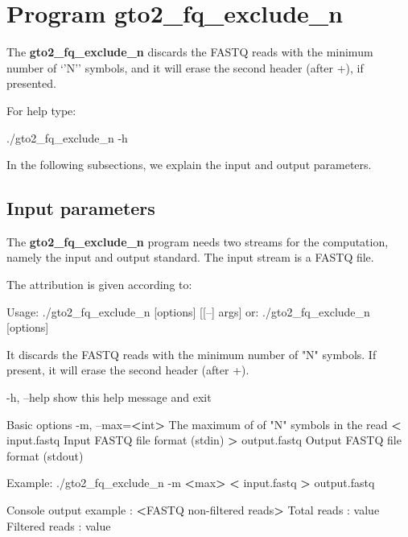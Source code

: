 \documentclass[11pt,]{krantz}
\newenvironment{Shaded}{\begin{snugshade}}{\end{snugshade}}
\newcommand{\StringTok}[1]{\textcolor[rgb]{0.5,0.5,0.5}{#1}}
\newcommand{\OperatorTok}[1]{\textcolor[rgb]{0.43,0.43,0.43}{\textbf{#1}}}
\newcommand{\ExtensionTok}[1]{#1}
\newcommand{\NormalTok}[1]{#1}
\begin{document}
\section{Program gto2\_fq\_exclude\_n}\label{program-gto2_fq_exclude_n}

The \textbf{gto2\_fq\_exclude\_n} discards the FASTQ reads with the
minimum number of `'N'' symbols, and it will erase the second header
(after +), if presented.

For help type:

\begin{Shaded}
\begin{Highlighting}[]
\ExtensionTok{./gto2_fq_exclude_n}\NormalTok{ -h}
\end{Highlighting}
\end{Shaded}

In the following subsections, we explain the input and output
parameters.

\subsection*{Input parameters}\label{input-parameters-2}


The \textbf{gto2\_fq\_exclude\_n} program needs two streams for the
computation, namely the input and output standard. The input stream is a
FASTQ file.

The attribution is given according to:

\begin{Shaded}
\begin{Highlighting}[]
\ExtensionTok{Usage}\NormalTok{: ./gto2_fq_exclude_n [options] [[--] args]}
   \ExtensionTok{or}\NormalTok{: ./gto2_fq_exclude_n [options]}

\ExtensionTok{It}\NormalTok{ discards the FASTQ reads with the minimum number of }\StringTok{"N"} 
\ExtensionTok{symbols.} 
\ExtensionTok{If}\NormalTok{ present, it will erase the second header (after +)}\ExtensionTok{.}

    \ExtensionTok{-h}\NormalTok{, --help            show this help message and exit}

\ExtensionTok{Basic}\NormalTok{ options}
    \ExtensionTok{-m}\NormalTok{, --max=}\OperatorTok{<}\NormalTok{int}\OperatorTok{>}\NormalTok{       The maximum of of }\StringTok{"N"}\NormalTok{ symbols in }
                          \ExtensionTok{the}\NormalTok{ read}
    \OperatorTok{<} \ExtensionTok{input.fastq}\NormalTok{         Input FASTQ file format (stdin)}
    \OperatorTok{>} \ExtensionTok{output.fastq}\NormalTok{        Output FASTQ file format (stdout)}

\ExtensionTok{Example}\NormalTok{: ./gto2_fq_exclude_n -m }\OperatorTok{<}\NormalTok{max}\OperatorTok{>} \OperatorTok{<}\NormalTok{ input.fastq }\OperatorTok{>} 
\ExtensionTok{output.fastq}

\ExtensionTok{Console}\NormalTok{ output example :}
\OperatorTok{<}\ExtensionTok{FASTQ}\NormalTok{ non-filtered reads}\OperatorTok{>}
\ExtensionTok{Total}\NormalTok{ reads    : value}
\ExtensionTok{Filtered}\NormalTok{ reads : value}
\end{Highlighting}
\end{Shaded}
\end{document}
